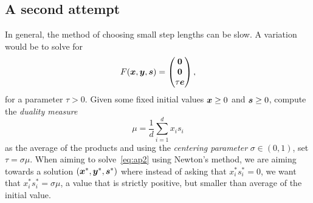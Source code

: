 \subsection{A second attempt}
In general, the method of choosing small step lengths can be slow. A variation would be to solve for
\begin{equation}\label{eq:ap2}
 F(\bm{x},\bm{y},\bm{s}) = \begin{pmatrix}
                               \bm{0}\\ \bm{0} \\ \tau \bm{e}
                              \end{pmatrix},
\end{equation}
for a parameter $\tau>0$. Given some fixed initial values $\bm{x}\geq 0$ and $\bm{s}\geq 0$, compute the {\em duality measure}
\begin{equation*}
 \mu = \frac{1}{d} \sum_{i=1}^d x_is_i
\end{equation*}
as the average of the products and using the {\em centering parameter} $\sigma\in (0,1)$, set $\tau = \sigma \mu$. When aiming to solve~\eqref{eq:ap2} using Newton's method, we are aiming towards a solution $(\bm{x}^*,\bm{y}^*,\bm{s}^*)$ where instead of 
asking that $x_i^*s_i^*=0$, we want that $x_i^*s_i^*=\sigma \mu$, a value that is strictly positive, but smaller than average of the initial value.


